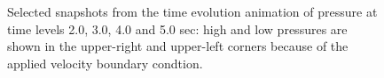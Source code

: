 \documentclass[11pt]{article}
\numberwithin{figure}{section}  %
\numberwithin{equation}{section}  %
\begin{document}
\begin{multicols}{2}
\begin{figure}[!htb]
	\centering
	\caption{Selected snapshots from the time evolution animation of pressure at time levels 2.0, 3.0, 4.0 and 5.0 sec: high and low pressures are shown in the upper-right and upper-left corners because of the applied velocity boundary condtion.}
	\label{fig:defaultpressure}
\end{figure}


\end{multicols}
\end{document}
